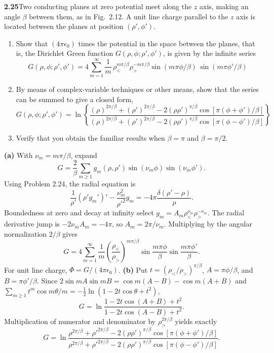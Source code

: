 \par\bigskip
\noindent\textbf{2.25}\quad Two conducting planes at zero potential meet along the $z$ axis, making an angle $\beta$ between them, as in Fig.~2.12. A unit line charge parallel to the $z$ axis is located between the planes at position $(\rho',\phi')$.
\begin{enumerate}
\item[(a)] Show that $(4\pi\epsilon_{0})$ times the potential in the space between the planes, that is, the Dirichlet Green function $G(\rho,\phi;\rho',\phi')$, is given by the infinite series
\[
G(\rho,\phi;\rho',\phi')=4\sum_{m=1}^{\infty}\frac{1}{m}\,\rho_{<}^{m\pi/\beta}\rho_{>}^{-m\pi/\beta}\sin(m\pi\phi/\beta)\,\sin(m\pi\phi'/\beta)
\]
\item[(b)] By means of complex-variable techniques or other means, show that the series can be summed to give a closed form,
\[
G(\rho,\phi;\rho',\phi')=\ln\left\{\frac{(\rho)^{2\pi/\beta}+(\rho')^{2\pi/\beta}-2(\rho\rho')^{\pi/\beta}\cos[\pi(\phi+\phi')/\beta]}{(\rho)^{2\pi/\beta}+(\rho')^{2\pi/\beta}-2(\rho\rho')^{\pi/\beta}\cos[\pi(\phi-\phi')/\beta]}\right\}
\]
\item[(c)] Verify that you obtain the familiar results when $\beta=\pi$ and $\beta=\pi/2$.
\end{enumerate}
\solution
\textbf{(a)} With $\nu_m=m\pi/\beta$, expand
\[
G=\frac2\beta\sum_{m\geq1}g_m(\rho,\rho')
                      \sin(\nu_m\phi)\sin(\nu_m\phi').
\]
Using Problem 2.24, the radial equation is
\[
\frac1{\rho'}(\rho'g_m')'-\frac{\nu_m^2}{\rho'^2}g_m
 =-4\pi\frac{\delta(\rho'-\rho)}\rho.
\]
Boundedness at zero and decay at infinity select
$g_m=A_m\rho_<^{\nu_m}\rho_>^{-\nu_m}$.
The radial derivative jump is $-2\nu_mA_m=-4\pi$, so
$A_m=2\pi/\nu_m$. Multiplying by the angular normalization
$2/\beta$ gives
\[
\boxed{G=4\sum_{m=1}^\infty\frac1m
 \left(\frac{\rho_<}{\rho_>}\right)^{m\pi/\beta}
 \sin\frac{m\pi\phi}\beta\sin\frac{m\pi\phi'}\beta.}
\]
For unit line charge, $\Phi=G/(4\pi\epsilon _0)$.
\textbf{(b)} Put
$t=(\rho_</\rho_>)^{\pi/\beta}$,
$A=\pi\phi/\beta$, and $B=\pi\phi'/\beta$.
Since $2\sin mA\sin mB=\cos m(A-B)-\cos m(A+B)$ and
$\sum_{m\geq1}t^m\cos m\theta/m
=-\tfrac12\ln(1-2t\cos\theta+t^2)$,
\[
G=\ln\frac{1-2t\cos(A+B)+t^2}{1-2t\cos(A-B)+t^2}.
\]
Multiplication of numerator and denominator by
$\rho_>^{2\pi/\beta}$ yields exactly
\[
\boxed{G=\ln\frac{\rho^{2\pi/\beta}+\rho'^{2\pi/\beta}
 -2(\rho\rho')^{\pi/\beta}\cos[\pi(\phi+\phi')/\beta]}
 {\rho^{2\pi/\beta}+\rho'^{2\pi/\beta}
 -2(\rho\rho')^{\pi/\beta}\cos[\pi(\phi-\phi')/\beta]}.}
\]
